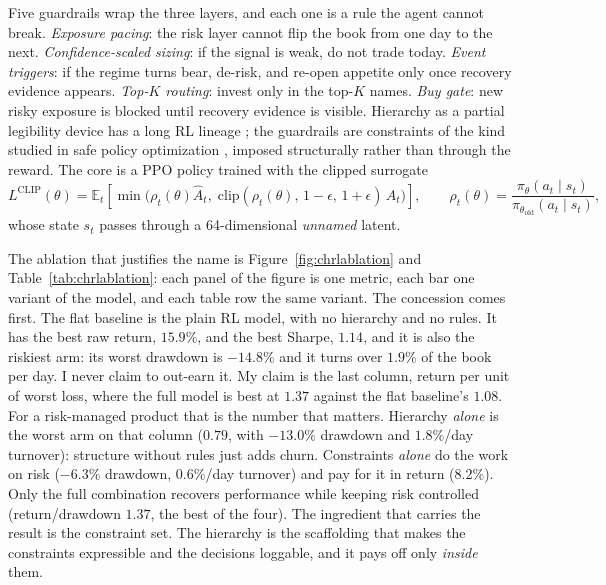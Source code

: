 \documentclass[11pt]{article}
\newcommand{\E}{\mathbb{E}}
\begin{document}
Five guardrails wrap the three layers, and each one is a rule the agent cannot break.
\emph{Exposure pacing}: the risk layer cannot flip the book from one day to the next.
\emph{Confidence-scaled sizing}: if the signal is weak, do not trade today. \emph{Event
triggers}: if the regime turns bear, de-risk, and re-open appetite only once recovery evidence
appears. \emph{Top-$K$ routing}: invest only in the top-$K$ names. \emph{Buy gate}: new risky
exposure is blocked until recovery evidence is visible. Hierarchy as a partial legibility device
has a long RL lineage \citep{sutton1999options,bacon2017option}; the guardrails are constraints of
the kind studied in safe policy optimization \citep{achiam2017}, imposed structurally rather than
through the reward. The core is a PPO policy \citep{schulman2017ppo} trained with the clipped
surrogate
\begin{equation}
L^{\text{CLIP}}(\theta) = \E_t\!\left[\min\!\big(\rho_t(\theta)\hat{A}_t,\;
\text{clip}(\rho_t(\theta),\,1{-}\epsilon,\,1{+}\epsilon)\,\hat{A}_t\big)\right],
\qquad \rho_t(\theta) = \frac{\pi_\theta(a_t \mid s_t)}{\pi_{\theta_{\text{old}}}(a_t \mid s_t)},
\label{eq:ppo}
\end{equation}
whose state $s_t$ passes through a 64-dimensional \emph{unnamed} latent.

The ablation that justifies the name is Figure~\ref{fig:chrlablation} and
Table~\ref{tab:chrlablation}: each panel of the figure is one metric, each bar one variant of the
model, and each table row the same variant. The concession comes first. The flat baseline is the
plain RL model, with no hierarchy and no rules. It has the
best raw return, $15.9\%$, and the best Sharpe, $1.14$, and it is also the riskiest arm: its worst
drawdown is $-14.8\%$ and it turns over $1.9\%$ of the book per day. I never claim to out-earn it.
My claim is the last column, return per unit of worst loss, where the full model is best at $1.37$
against the flat baseline's $1.08$. For a risk-managed product that is the number that matters.
Hierarchy \emph{alone} is the worst arm on that column ($0.79$, with $-13.0\%$ drawdown and
$1.8\%$/day turnover): structure without rules just adds churn. Constraints \emph{alone} do the
work on risk ($-6.3\%$ drawdown, $0.6\%$/day turnover) and pay for it in return ($8.2\%$). Only
the full combination recovers performance while keeping risk controlled (return/drawdown $1.37$,
the best of the four). The ingredient that carries the result is the constraint set. The hierarchy
is the scaffolding that makes the constraints expressible and the decisions loggable, and it pays
off only \emph{inside} them.
\end{document}
